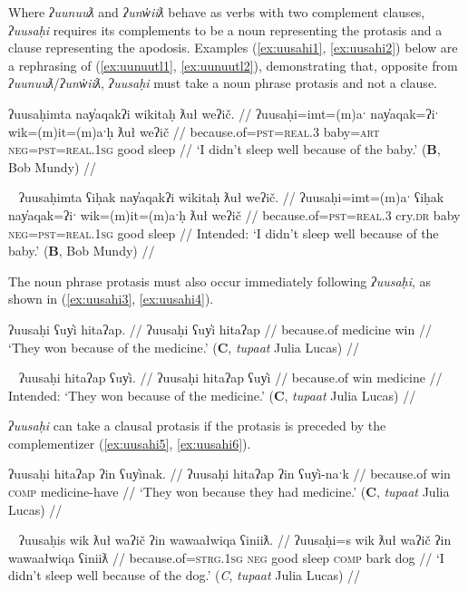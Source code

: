 Where \textit{ʔuunuuƛ} and \textit{ʔunw̓iiƛ} behave as verbs with two complement clauses, \textit{ʔuusaḥi} requires its complements to be a noun representing the protasis and a clause representing the apodosis. Examples (\ref{ex:uusahi1}, \ref{ex:uusahi2}) below are a rephrasing of (\ref{ex:uunuutl1}, \ref{ex:uunuutl2}), demonstrating that, opposite from \textit{ʔuunuuƛ}/\textit{ʔunw̓iiƛ}, \textit{ʔuusaḥi} must take a noun phrase protasis and not a clause. 

\ex \label{ex:uusahi1}
\begingl
\glpreamble ʔuusaḥimta nay̓aqakʔi wikitaḥ ƛuł weʔič. //
\gla ʔuusaḥi=imt=(m)aˑ nay̓aqak=ʔiˑ wik=(m)it=(m)aˑḥ ƛuł weʔič //
\glb because.of=\textsc{pst}=\textsc{real.3} baby=\textsc{art} \textsc{neg}=\textsc{pst}=\textsc{real.1sg} good sleep //
\glft `I didn't sleep well because of the baby.' (\textbf{B}, Bob Mundy) //
\endgl
\xe

\ex~ \label{ex:uusahi2}
\begingl
\glpreamble *ʔuusaḥimta ʕiḥak nay̓aqakʔi wikitaḥ ƛuł weʔič. //
\gla ʔuusaḥi=imt=(m)aˑ ʕiḥak nay̓aqak=ʔiˑ wik=(m)it=(m)aˑḥ ƛuł weʔič //
\glb because.of=\textsc{pst}=\textsc{real.3} cry.\textsc{dr} baby \textsc{neg}=\textsc{pst}=\textsc{real.1sg} good sleep //
\glft Intended: `I didn't sleep well because of the baby.' (\textbf{B}, Bob Mundy) //
\endgl
\xe

The noun phrase protasis must also occur immediately following \textit{ʔuusaḥi}, as shown in (\ref{ex:uusahi3}, \ref{ex:uusahi4}).

\ex \label{ex:uusahi3}
\begingl
\glpreamble ʔuusaḥi ʕuy̓i hitaʔap. //
\gla ʔuusaḥi ʕuy̓i hitaʔap //
\glb because.of medicine win //
\glft `They won because of the medicine.' (\textbf{C}, \textit{tupaat} Julia Lucas) //
\endgl
\xe

\ex~ \label{ex:uusahi4}
\begingl
\glpreamble *ʔuusaḥi hitaʔap ʕuy̓i. //
\gla ʔuusaḥi hitaʔap ʕuy̓i //
\glb because.of win medicine //
\glft Intended: `They won because of the medicine.' (\textbf{C}, \textit{tupaat} Julia Lucas) //
\endgl
\xe

\textit{ʔuusaḥi} can take a clausal protasis if the protasis is preceded by the complementizer (\ref{ex:uusahi5}, \ref{ex:uusahi6}).

\ex \label{ex:uusahi5}
\begingl
\glpreamble ʔuusaḥi hitaʔap ʔin ʕuy̓inak. //
\gla ʔuusaḥi hitaʔap ʔin ʕuy̓i-naˑk //
\glb because.of win \textsc{comp} medicine-have  //
\glft `They won because they had medicine.' (\textbf{C}, \textit{tupaat} Julia Lucas) //
\endgl
\xe

\ex~ \label{ex:uusahi6}
\begingl
\glpreamble ʔuusaḥis wik ƛuł waʔič ʔin wawaałwiqa ʕiniiƛ. //
\gla ʔuusaḥi=s wik ƛuł waʔič ʔin wawaałwiqa ʕiniiƛ //
\glb because.of=\textsc{strg.1sg} \textsc{neg} good sleep \textsc{comp} bark dog  //
\glft `I didn't sleep well because of the dog.' (\textit{C}, \textit{tupaat} Julia Lucas) //
\endgl
\xe

